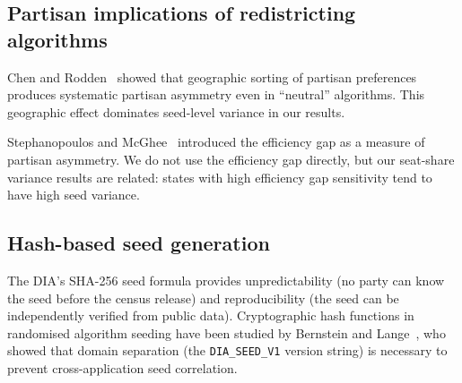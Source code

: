 \subsection{Partisan implications of redistricting algorithms}

Chen and Rodden~\citep{chen2013unintentional} showed that geographic
sorting of partisan preferences produces systematic partisan asymmetry
even in ``neutral'' algorithms.  This geographic effect dominates
seed-level variance in our results.

Stephanopoulos and McGhee~\citep{stephanopoulos2015partisan} introduced
the efficiency gap as a measure of partisan asymmetry.  We do not use
the efficiency gap directly, but our seat-share variance results are
related: states with high efficiency gap sensitivity tend to have high
seed variance.

\subsection{Hash-based seed generation}

The DIA's SHA-256 seed formula provides unpredictability (no party can
know the seed before the census release) and reproducibility (the seed
can be independently verified from public data).  Cryptographic hash
functions in randomised algorithm seeding have been studied by Bernstein
and Lange~\citep{bernstein2019}, who showed that domain separation
(the \texttt{DIA\_SEED\_V1} version string) is necessary to prevent
cross-application seed correlation.
